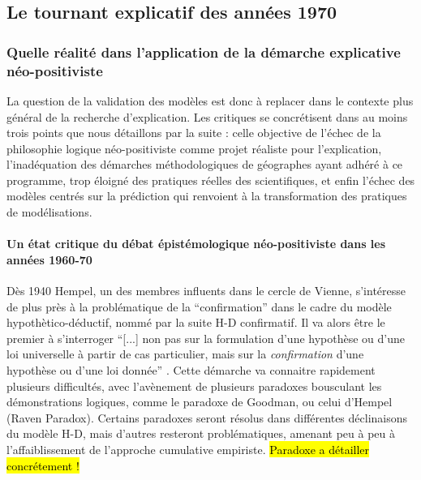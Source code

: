
\subsection{Le tournant explicatif des années 1970}
\label{ssec:transition_annee70}

\subsubsection{Quelle réalité dans l'application de la démarche explicative néo-positiviste}
\label{sssec:realite_neopositiviste}

La question de la validation des modèles est donc à replacer dans le contexte plus général de la recherche d'explication. Les critiques se concrétisent dans au moins trois points que nous détaillons par la suite : celle objective de l'échec de la philosophie logique néo-positiviste comme projet réaliste pour l'explication, l'inadéquation des démarches méthodologiques de géographes ayant adhéré à ce programme, trop éloigné des pratiques réelles des scientifiques, et enfin l’échec des modèles centrés sur la prédiction qui renvoient à la transformation des pratiques de modélisations.

\paragraph{Un état critique du débat épistémologique néo-positiviste dans les années 1960-70}
\label{p:critique_debat}

Dès 1940 Hempel, un des membres influents dans le cercle de Vienne, s'intéresse de plus près à la problématique de la \enquote{confirmation} dans le cadre du modèle hypothètico-déductif, nommé par la suite H-D confirmatif. Il va alors être le premier à s'interroger \enquote{[...] non pas sur la formulation d'une hypothèse ou d'une loi universelle à partir de cas particulier, mais sur la \textit{confirmation} d'une hypothèse ou d'une loi donnée} \autocite{Lecourt2006}. Cette démarche va connaitre rapidement plusieurs difficultés, avec l’avènement de plusieurs paradoxes bousculant les démonstrations logiques, comme le paradoxe de Goodman, ou celui d'Hempel (Raven Paradox). Certains paradoxes seront résolus dans différentes déclinaisons du modèle H-D, mais d'autres resteront problématiques, amenant peu à peu à l'affaiblissement de l'approche cumulative empiriste. \hl{Paradoxe a détailler concrétement !}

